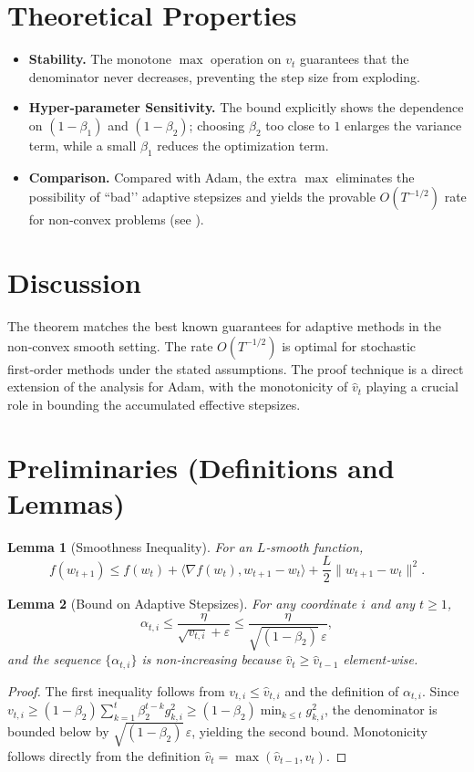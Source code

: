 \documentclass{article}
\newtheorem{lemma}{Lemma}
\begin{document}
\section*{Theoretical Properties}
\begin{itemize}
\item \textbf{Stability.} The monotone $\max$ operation on $v_{t}$ guarantees that the denominator never decreases, preventing the step size from exploding.
\item \textbf{Hyper‑parameter Sensitivity.} The bound explicitly shows the dependence on $(1-\beta_{1})$ and $(1-\beta_{2})$; choosing $\beta_{2}$ too close to $1$ enlarges the variance term, while a small $\beta_{1}$ reduces the optimization term.
\item \textbf{Comparison.} Compared with Adam, the extra $\max$ eliminates the possibility of “bad’’ adaptive stepsizes and yields the provable $O(T^{-1/2})$ rate for non‑convex problems (see \cite{redidi2018convergence}).
\end{itemize}

\section*{Discussion}
The theorem matches the best known guarantees for adaptive methods in the non‑convex smooth setting. The rate $O(T^{-1/2})$ is optimal for stochastic first‑order methods under the stated assumptions. The proof technique is a direct extension of the analysis for Adam, with the monotonicity of $\hat v_{t}$ playing a crucial role in bounding the accumulated effective stepsizes.

\newpage
\section*{Preliminaries (Definitions and Lemmas)}
\begin{lemma}[Smoothness Inequality]\label{lem:smooth}
For an $L$‑smooth function,
\[
f(w_{t+1})\le f(w_{t})+\langle\nabla f(w_{t}),w_{t+1}-w_{t}\rangle+\frac{L}{2}\|w_{t+1}-w_{t}\|^{2}.
\]
\end{lemma}
\begin{lemma}[Bound on Adaptive Stepsizes]\label{lem:stepsize}
For any coordinate $i$ and any $t\ge1$,
\[
\alpha_{t,i}\le\frac{\eta}{\sqrt{v_{t,i}}+\varepsilon}
\le\frac{\eta}{\sqrt{(1-\beta_{2})}\,\varepsilon},
\]
and the sequence $\{\alpha_{t,i}\}$ is non‑increasing because $\hat v_{t}\ge\hat v_{t-1}$ element‑wise.
\end{lemma}
\begin{proof}
The first inequality follows from $v_{t,i}\le\hat v_{t,i}$ and the definition of $\alpha_{t,i}$.
Since $v_{t,i}\ge (1-\beta_{2})\sum_{k=1}^{t}\beta_{2}^{t-k}g_{k,i}^{2}\ge (1-\beta_{2})\min_{k\le t}g_{k,i}^{2}$,
the denominator is bounded below by $\sqrt{(1-\beta_{2})}\,\varepsilon$, yielding the second bound.
Monotonicity follows directly from the definition $\hat v_{t}=\max(\hat v_{t-1},v_{t})$. \qedhere
\end{proof}
\end{document}
